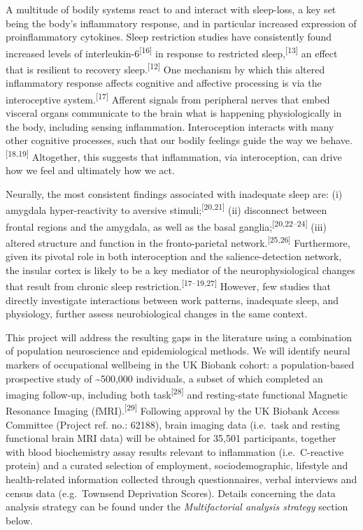 \documentclass[
  english,
  man, donotrepeattitle]{apa6}
\begin{document}
A multitude of bodily systems react to and interact with sleep-loss, a key set being the body's inflammatory response, and in particular increased expression of proinflammatory cytokines. Sleep restriction studies have consistently found increased levels of interleukin-6\textsuperscript{{[}16{]}} in response to restricted sleep,\textsuperscript{{[}13{]}} an effect that is resilient to recovery sleep.\textsuperscript{{[}12{]}} One mechanism by which this altered inflammatory response affects cognitive and affective processing is via the interoceptive system.\textsuperscript{{[}17{]}} Afferent signals from peripheral nerves that embed visceral organs communicate to the brain what is happening physiologically in the body, including sensing inflammation. Interoception interacts with many other cognitive processes, such that our bodily feelings guide the way we behave.\textsuperscript{{[}18,19{]}} Altogether, this suggests that inflammation, via interoception, can drive how we feel and ultimately how we act.

Neurally, the most consistent findings associated with inadequate sleep are: (i) amygdala hyper-reactivity to aversive stimuli;\textsuperscript{{[}20,21{]}} (ii) disconnect between frontal regions and the amygdala, as well as the basal ganglia;\textsuperscript{{[}20,22--24{]}} (iii) altered structure and function in the fronto-parietal network.\textsuperscript{{[}25,26{]}} Furthermore, given its pivotal role in both interoception and the salience-detection network, the insular cortex is likely to be a key mediator of the neurophysiological changes that result from chronic sleep restriction.\textsuperscript{{[}17--19,27{]}} However, few studies that directly investigate interactions between work patterns, inadequate sleep, and physiology, further assess neurobiological changes in the same context.

This project will address the resulting gaps in the literature using a combination of population neuroscience and epidemiological methods. We will identify neural markers of occupational wellbeing in the UK Biobank cohort: a population-based prospective study of \textasciitilde500,000 individuals, a subset of which completed an imaging follow-up, including both task\textsuperscript{{[}28{]}} and resting-state functional Magnetic Resonance Imaging (fMRI).\textsuperscript{{[}29{]}} Following approval by the UK Biobank Access Committee (Project ref. no.: 62188), brain imaging data (i.e.~task and resting functional brain MRI data) will be obtained for 35,501 participants, together with blood biochemistry assay results relevant to inflammation (i.e.~C-reactive protein) and a curated selection of employment, sociodemographic, lifestyle and health-related information collected through questionnaires, verbal interviews and census data (e.g.~Townsend Deprivation Scores). Details concerning the data analysis strategy can be found under the \emph{Multifactorial analysis strategy} section below.
\end{document}
